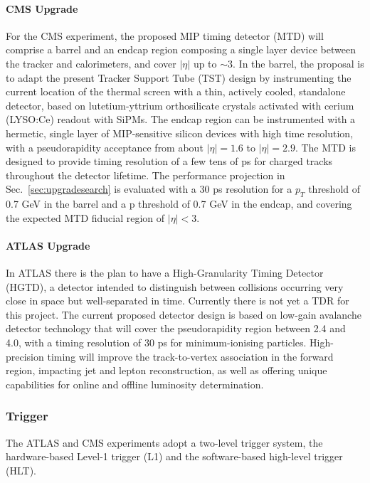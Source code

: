 \paragraph{CMS Upgrade} 
For the CMS experiment, the proposed MIP timing detector (MTD) will comprise a barrel and an endcap region composing a single layer device between the tracker and calorimeters, and cover $|\eta|$ up to $\sim3$. 
In the barrel, the proposal is to adapt the present Tracker Support Tube (TST) design by instrumenting the current location of the thermal screen with a thin, actively cooled, standalone detector, based on lutetium-yttrium orthosilicate crystals activated with cerium (LYSO:Ce) readout with SiPMs.
The endcap region can be instrumented with a hermetic, single layer of MIP-sensitive silicon devices with high time resolution, with a pseudorapidity acceptance from about $|\eta|=1.6$ to $|\eta|=2.9$.
The MTD is designed to provide timing resolution of a few tens of ps for charged tracks throughout the detector lifetime. 
The performance projection in Sec.~\ref{sec:upgradesearch} is evaluated with a 30 ps resolution for a $p_T$ threshold of 0.7 GeV in the barrel and a p threshold of 0.7 GeV in the endcap, and covering the expected MTD fiducial region of $|\eta| < 3$.

\paragraph{ATLAS Upgrade}
In ATLAS  there is the plan to have a High-Granularity Timing Detector (HGTD),
a detector intended to distinguish between collisions occurring very close in space but
well-separated in time. Currently there is not yet a TDR for this project.
The current proposed detector design is based on low-gain avalanche
detector technology that will cover the pseudorapidity region between 2.4 and 4.0,
with a timing resolution of 30 ps for minimum-ionising particles. High-precision timing
will improve the track-to-vertex association in the forward region, impacting jet and lepton
reconstruction, as well as offering unique capabilities for online and offline luminosity determination.


\subsubsection{Trigger} \label{sec:upgradetrigger}

The ATLAS and CMS experiments adopt a two-level trigger system, the hardware-based Level-1 trigger (L1) and the software-based high-level trigger (HLT). 

